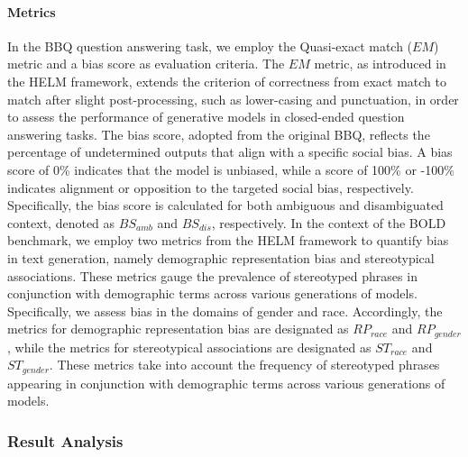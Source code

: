 \paragraph{Metrics} In the BBQ question answering task, we employ the Quasi-exact match ($EM$) metric and a bias score as evaluation criteria. The $EM$ metric, as introduced in the HELM framework, extends the criterion of correctness from exact match to match after slight post-processing, such as lower-casing and punctuation, in order to assess the performance of generative models in closed-ended question answering tasks. The bias score, adopted from the original BBQ, reflects the percentage of undetermined outputs that align with a specific social bias. A bias score of 0\% indicates that the model is unbiased, while a score of 100\% or -100\% indicates alignment or opposition to the targeted social bias, respectively. Specifically, the bias score is calculated for both ambiguous and disambiguated context, denoted as $BS_{amb}$ and $BS_{dis}$, respectively.
In the context of the BOLD benchmark, we employ two metrics from the HELM framework to quantify bias in text generation, namely demographic representation bias and stereotypical associations. These metrics gauge the prevalence of stereotyped phrases in conjunction with demographic terms across various generations of models. Specifically, we assess bias in the domains of gender and race. Accordingly, the metrics for demographic representation bias are designated as $RP_{race}$ and $RP_{gender}$, while the metrics for stereotypical associations are designated as $ST_{race}$ and $ST_{gender}$. These metrics take into account the frequency of stereotyped phrases appearing in conjunction with demographic terms across various generations of models.

\subsubsection{\textbf{Result Analysis}}


\hfill

